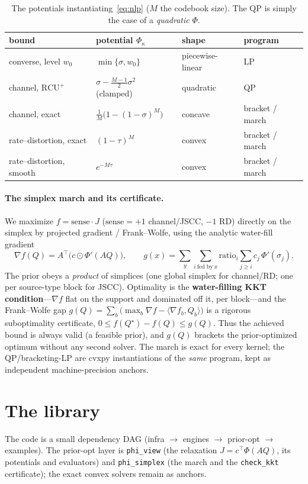 \documentclass[11pt]{article}
\newcommand{\Tr}{^{\!\top}}
\begin{document}
\begin{table}[H]\centering
\begin{tabular}{@{}llll@{}}
\toprule
bound & potential $\Phi_\kappa$ & shape & program \\
\midrule
converse, level $w_0$ & $\min\{\sigma,w_0\}$ & piecewise-linear & LP \\
channel, $\mathrm{RCU}^+$ & $\sigma-\tfrac{M-1}{2}\sigma^2$ (clamped) & quadratic & QP \\
channel, exact & $\tfrac1M\big(1-(1-\sigma)^M\big)$ & concave & bracket / march \\
rate--distortion, exact & $(1-\tau)^M$ & convex & bracket / march \\
rate--distortion, smooth & $e^{-M\tau}$ & convex & bracket / march \\
\bottomrule
\end{tabular}
\caption{The potentials instantiating~\eqref{eq:nlp} ($M$ the codebook size). The
QP is simply the case of a \emph{quadratic} $\Phi$.}
\label{tab:phi}
\end{table}

\paragraph{The simplex march and its certificate.}
We maximize $f=\mathrm{sense}\cdot J$ ($\mathrm{sense}=+1$ channel/JSCC, $-1$ RD)
directly on the simplex by projected gradient / Frank--Wolfe, using the analytic
water-fill gradient
\begin{equation}
\nabla f(Q)=A\Tr\!\big(c\odot \Phi'(AQ)\big),\qquad
g(x)=\sum_y\sum_{i\ \text{fed by}\ x}\!\mathrm{ratio}_i\!\sum_{j\ge i} c_j\,\Phi'(\sigma_j).
\end{equation}
The prior obeys a \emph{product} of simplices (one global simplex for channel/RD; one
per source-type block for JSCC). Optimality is the \textbf{water-filling KKT
condition}---$\nabla f$ flat on the support and dominated off it, per block---and the
Frank--Wolfe gap $g(Q)=\sum_b\big(\max_b\nabla f-\langle\nabla f_b,Q_b\rangle\big)$
is a rigorous suboptimality certificate, $0\le f(Q^\star)-f(Q)\le g(Q)$. Thus the
achieved bound is always valid (a feasible prior), and $g(Q)$ brackets the
prior-optimized optimum without any second solver. The march is exact for every
kernel; the QP/bracketing-LP are cvxpy instantiations of the \emph{same} program,
kept as independent machine-precision anchors.

\section{The library}\label{sec:lib}
The code is a small dependency DAG (infra $\to$ engines $\to$ prior-opt $\to$
examples). The prior-opt layer is \texttt{phi\_view} (the relaxation
$J=c\Tr\Phi(AQ)$, its potentials and evaluators) and \texttt{phi\_simplex} (the
march and the \texttt{check\_kkt} certificate); the exact convex solvers remain as
anchors.
\end{document}
